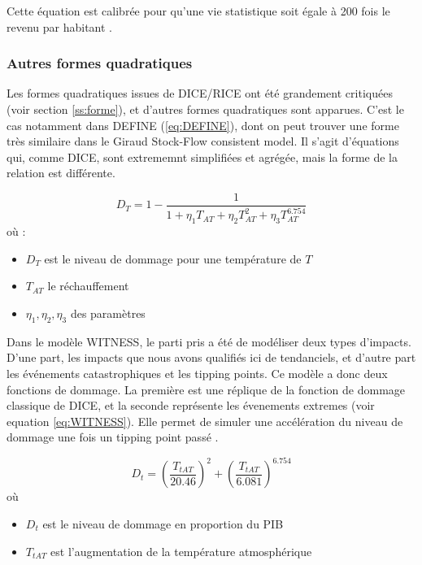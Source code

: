 Cette équation est calibrée pour qu'une vie statistique soit égale à 200 fois le revenu par habitant \autocite{anthoff_fund_nodate}. 

\subsubsection{Autres formes quadratiques}

Les formes quadratiques issues de DICE/RICE ont été grandement critiquées (voir section \ref{ss:forme}), et d'autres formes quadratiques sont apparues. C'est le cas notamment dans DEFINE (\ref{eq:DEFINE}), dont on peut trouver une forme très similaire dans le Giraud Stock-Flow consistent model. Il s'agit d'équations qui, comme DICE, sont extrememnt simplifiées et agrégée, mais la forme de la relation est différente. 

\begin{equation}
    D_T = 1 - \frac{1}{1 + \eta_1 T_{AT} + \eta_2 T_{AT}^2 + \eta_3 T_{AT}^{6.754}}
    \label{eq:DEFINE}
\end{equation}
où : 

\begin{itemize}
    \item $D_T$ est le niveau de dommage pour une température de $T$
    \item $T_{AT}$ le réchauffement
    \item $\eta_1, \eta_2, \eta_3$ des paramètres
\end{itemize}

Dans le modèle WITNESS, le parti pris a été de modéliser deux types d'impacts. D'une part, les impacts que nous avons qualifiés ici de tendanciels, et d'autre part les événements catastrophiques et les tipping points. Ce modèle a donc deux fonctions de dommage. La première est une réplique de la fonction de dommage classique de DICE, et la seconde représente les évenements extremes (voir equation \ref{eq:WITNESS}). Elle permet de simuler une accélération du niveau de dommage une fois un tipping point passé  \autocite{noauthor_witness_nodate}. 

\begin{equation}
    D_t=\left(\frac{T_{t A T}}{20.46}\right)^2+\left(\frac{T_{t A T}}{6.081}\right)^{6.754}
    \label{eq:WITNESS}
\end{equation}
où 
\begin{itemize}
    \item $D_t$ est le niveau de dommage en proportion du PIB
    \item $T_{tAT}$ est l'augmentation de la température atmosphérique
\end{itemize}

